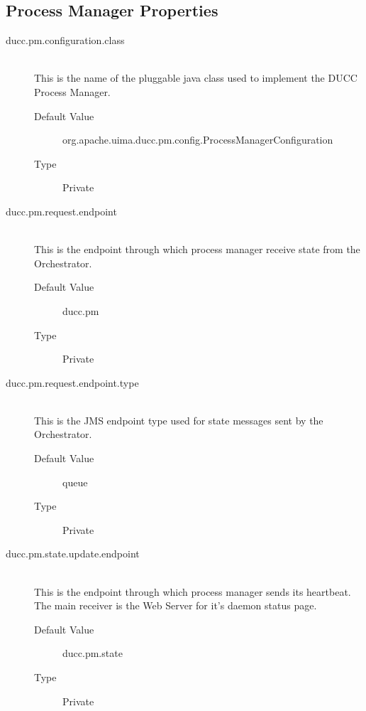 \subsection{Process Manager Properties}

    \begin{description}

      \item[ducc.pm.configuration.class] \hfill \\
        This is the name of the pluggable java class used to implement the DUCC Process 
        Manager. 
        \begin{description}
          \item[Default Value] org.apache.uima.ducc.pm.config.ProcessManagerConfiguration 
          \item[Type] Private
        \end{description} 
        
      \item[ducc.pm.request.endpoint] \hfill \\
        This is the endpoint through which process manager receive state from the Orchestrator. 
        \begin{description}
          \item[Default Value] ducc.pm 
          \item[Type] Private 
        \end{description}
        
      \item[ducc.pm.request.endpoint.type] \hfill \\
        This is the JMS endpoint type used for state messages sent by the Orchestrator. 
        \begin{description}
          \item[Default Value] queue 
          \item[Type] Private 
        \end{description}
        
      \item[ducc.pm.state.update.endpoint] \hfill \\
        This is the endpoint through which process manager sends its heartbeat. The main receiver 
        is the Web Server for it's daemon status page. 
        \begin{description}
          \item[Default Value] ducc.pm.state 
          \item[Type] Private 
        \end{description}
        

\end{description}
